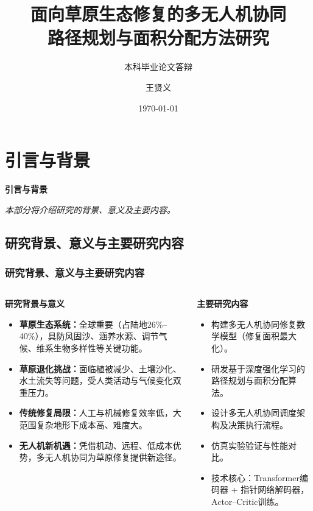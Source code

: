 \documentclass[10pt, aspectratio=169]{beamer}  %
\title{面向草原生态修复的多无人机协同\\路径规划与面积分配方法研究}
\subtitle{本科毕业论文答辩}
\author{王贤义}
\institute{兰州大学信息科学与工程学院}
\date{\today}
\begin{document}
\section{引言与背景}
\begin{frame}
	\centering %
	{\Huge \sffamily\bfseries\textcolor{njupt}{引言与背景}}
	\par %
	\vspace{0.5cm} %
	{\large \itshape{本部分将介绍研究的背景、意义及主要内容。}} %
\end{frame}

\subsection{研究背景、意义与主要研究内容}
\begin{frame}
	\frametitle{研究背景、意义与主要研究内容}
	\begin{columns}[T]
		\begin{column}{0.5\textwidth} %
			\footnotesize %
			\textbf{研究背景与意义}
			\begin{itemize}
				\item \textbf{草原生态系统：}全球重要（占陆地26\%--40\%），具防风固沙、涵养水源、调节气候、维系生物多样性等关键功能。
				\item \textbf{草原退化挑战：}面临植被减少、土壤沙化、水土流失等问题，受人类活动与气候变化双重压力。
				\item \textbf{传统修复局限：}人工与机械修复效率低，大范围复杂地形下成本高、难度大。
				\item \textbf{无人机新机遇：}凭借机动、远程、低成本优势，多无人机协同为草原修复提供新途径。
			\end{itemize}
		\end{column}
		\begin{column}{0.5\textwidth} %
			\footnotesize %
			\textbf{主要研究内容}
			\begin{itemize}
				\item 构建多无人机协同修复数学模型（修复面积最大化）。
				\item 研发基于深度强化学习的路径规划与面积分配算法。
				\item 设计多无人机协同调度架构及决策执行流程。
				\item 仿真实验验证与性能对比。
				\item 技术核心：Transformer编码器 + 指针网络解码器，Actor--Critic训练。
			\end{itemize}
		\end{column}
	\end{columns}
\end{frame}
\end{document}
